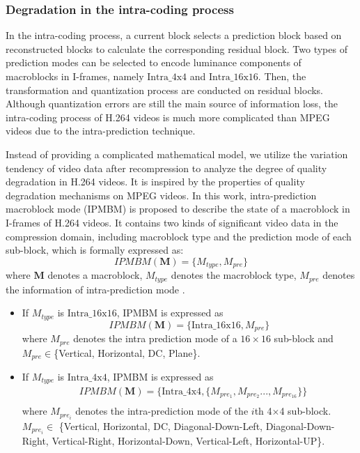 \documentclass[journal,sort]{IEEEtran}
\begin{document}
\subsubsection{Degradation in the intra-coding process \label{degrad-intra_h264}}
In the intra-coding process, a current block selects a prediction block based on reconstructed blocks to calculate the corresponding residual block. Two types of prediction modes can be selected to encode luminance components of macroblocks in I-frames, namely $\text{Intra}\_\text{4x4}$ and $\text{Intra}\_\text{16x16}$. Then, the transformation and quantization process are conducted on residual blocks. Although quantization errors are still the main source of information loss, the intra-coding process of H.264 videos is much more complicated than MPEG videos due to the intra-prediction technique.

Instead of providing a complicated mathematical model, we utilize the variation tendency of video data after recompression to analyze the degree of quality degradation in H.264 videos. It is inspired by the properties of quality degradation mechanisms on MPEG videos. In this work, intra-prediction macroblock mode (IPMBM) is proposed to describe the state of a macroblock in I-frames of H.264 videos. It contains two kinds of significant video data in the compression domain, including macroblock type and the prediction mode of each sub-block, which is formally expressed as:
 \begin{equation}
 IPMBM(\mathbf{M}) = \{M_{type},M_{pre}\}\label{ipmbm-define}
 \end{equation}
where $\mathbf{M}$ denotes a macroblock, $M_{type}$ denotes the macroblock type, $M_{pre}$ denotes the information of intra-prediction mode \cite{wiegand2003overview}.
 
 \begin{itemize}    
 	\item If $M_{type}$ is $\text{Intra}\_\text{16x16}$, IPMBM is expressed as
 	\begin{equation}
 	IPMBM(\mathbf{M}) = \{\text{Intra}\_\text{16x16},M_{pre}\}
 	\end{equation}
 	where $M_{pre}$ denotes the intra prediction mode of a $16\times16$ sub-block and $ M_{pre} \in $\{Vertical, Horizontal, DC, Plane\}.
 	
 	\item If $M_{type}$ is $\text{Intra}\_\text{4x4}$, IPMBM is expressed as
 	\begin{equation}
 	\begin{aligned}
 	&IPMBM(\mathbf{M}) = \{ \text{Intra}\_\text{4x4},\{M_{pre_1},M_{pre_2}...,M_{pre_{16}}\}\}\\
 	\end{aligned}
 	\end{equation}
 	where $M_{pre_i}$ denotes the intra-prediction mode of the $i$th 4$\times$4 sub-block. $M_{pre_i} \in$ \{Vertical, Horizontal, DC,  Diagonal-Down-Left, Diagonal-Down-Right, Vertical-Right, Horizontal-Down, Vertical-Left, Horizontal-UP\}. 
 \end{itemize}	
 
\end{document}
